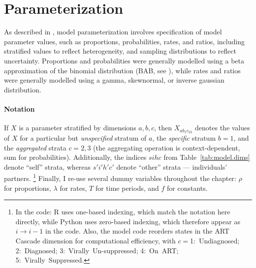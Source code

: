 \section{Parameterization}\label{model.par}
As described in , model parameterization involves
specification of model parameter values, such as proportions, probabilities, rates, and ratios,
including stratified values to reflect heterogeneity,
and sampling distributions to reflect uncertainty.
Proportions and probabilities were generally modelled using
a beta approximation of the binomial distribution (BAB, see ),
while rates and ratios were generally modelled using
a gamma, skewnormal, or inverse gaussian distribution.
\paragraph{Notation}
If $X$ is a parameter stratified by dimensions $a,b,c$,
then $X_{ab_{1}c_{23}}$ denotes the values of $X$ for
a particular but \emph{unspecified} stratum of $a$,
the \emph{specific} stratum $b = 1$,
and the \emph{aggregated} strata $c = 2,3$
(the aggregating operation is context-dependent, \eg sum for probabilities).
Additionally, the indices $sihc$ from Table~\ref{tab:model.dims} denote ``self'' strata,
whereas $s'i'h'c'$ denote ``other'' strata --- \ie individuals' partners.%
\footnote{\label{foot:code.note}%
  In the code: R uses one-based indexing, which match the notation here directly,
  while Python uses zero-based indexing, which therefore appear as $i \rightarrow i-1$ in the code.
  Also, the model code reorders states in the ART Cascade dimension for computational efficiency,
  with $c={}$1:~Undiagnosed; 2:~Diagnosed; 3:~Virally~Un-suppressed; 4:~On~ART; 5:~Virally~Suppressed.}
Finally, I re-use several dummy variables throughout the chapter:
$\rho$ for proportions, $\lambda$ for rates, $T$ for time periods, and $f$ for constants.



